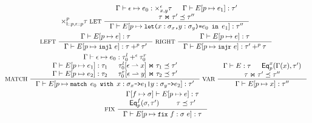 \begin{figure}
\begin{gather*}
{      \times_{\leftchild \cons p, \rightchild \cons p}^p \tau } 
    \inference[ LET ]{
      \Gamma \judges \epsilon \mapsto e_0 : %
      \times_{x, y}^{\epsilon} \tau &
      \Gamma \judges \upd{ E }{ p }{ e_1 } : \tau' \\
      \tau \Join \tau' \subtype \tau'' }{
      \Gamma \judges \upd{E}{p}{ %
        \letexp{x}{\sigma_x}{y}{\sigma_y}{e_0}{e_1} } : %
      \tau'' } \\
    \inference[ LEFT ]{
      \Gamma \judges \upd{E}{p}{ e } : \tau }{
      \Gamma \judges \upd{E}{p}{ \injl\ e} : %
      \tau +^p \tau' } 
    \inference[ RIGHT ]{
      \Gamma \judges \upd{E}{p}{ e } : \tau }{
      \Gamma \judges \upd{E}{p}{ \injr\ e} : %
      \tau' +^p \tau } \\
    \inference[ MATCH ]{
      \Gamma \judges \epsilon \mapsto e_0 : %
      \tau_0^l +^\epsilon \tau_0^r \\
      \Gamma \judges \upd{ E }{ p }{ e_1 } : \tau_1 & %
      \rename{ \tau_0^l }{ \epsilon }{ x } \Join \tau_1 \subtype \tau' \\
      \Gamma \judges \upd{ E }{ p }{ e_2 } : \tau_2 & %
      \rename{ \tau_0^r }{ \epsilon }{ y } \Join \tau_2 \subtype \tau' }{
      \Gamma \judges %
      \upd{E}{p}{ \matchexp{e_0}{ x }{\sigma_x}{e_1}{ y }{\sigma_y}{e_2} } : \tau' }
    \inference[ VAR ]{ %
      \Gamma \judges E : \tau & %
      \iseq{p}{x}(\Gamma(x), \tau') \\
      \tau \Join \tau' \subtype \tau'' }{ %
      \Gamma \judges \upd{ E }{ p }{ x } : \tau'' } \\
    \inference[ FIX ]{
      \upd{ \Gamma }{ f }{ \sigma } \judges %
      \upd{ E }{ p }{ e } : \tau \\
      \iseq{p}{f}(\sigma, \tau') & \tau \subtype \tau' }{ %
      \Gamma \judges \upd{ E }{ p }{ \fix{f}{\sigma}{e} }: \tau }

\end{gather*}
\end{figure}
